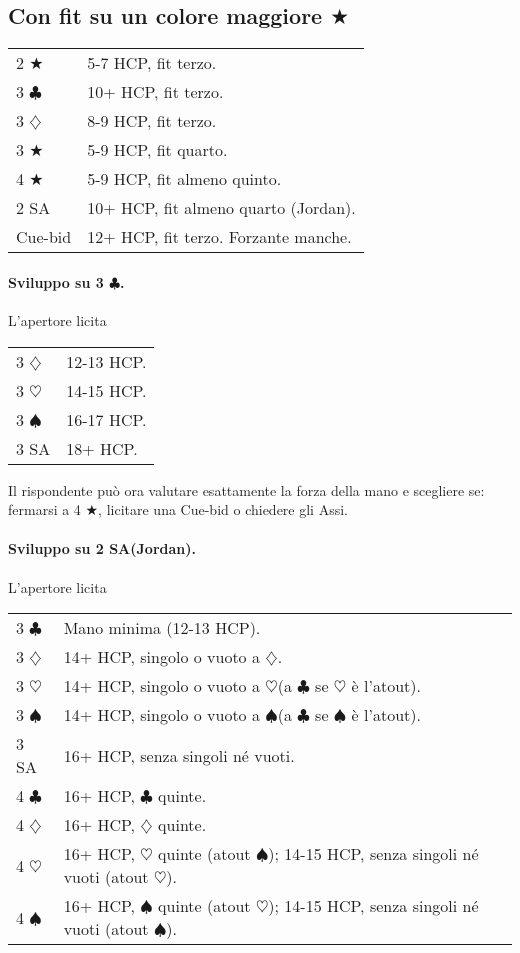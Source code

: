 \documentclass[a4paper,10pt]{article}
\renewcommand{\c}{$\clubsuit$\xspace}
\renewcommand{\d}{$\diamondsuit$\xspace}
\newcommand{\h}{$\heartsuit$\xspace}
\newcommand{\s}{$\spadesuit$\xspace}
\renewcommand{\j}{$\bigstar$\xspace}
\newcommand{\sa}{SA\xspace}
\newcommand{\smallspace}{\vskip0.3cm}
\newenvironment{twocol}
  {\smallspace\noindent\begin{tabular}{l p{0.8\textwidth}}}
  {\end{tabular}\smallspace}
\begin{document}
\subsection{Con fit su un colore maggiore \j}

\begin{twocol}
 2 \j  & 5-7 HCP, fit terzo.\\
 3 \c & 10+ HCP, fit terzo.\\
 3 \d & 8-9 HCP, fit terzo.\\
 3 \j  & 5-9 HCP, fit quarto.\\
 4 \j  & 5-9 HCP, fit almeno quinto.\\
 2 \sa & 10+ HCP, fit almeno quarto (Jordan).\\
 Cue-bid & 12+ HCP, fit terzo. Forzante manche.
\end{twocol}

\paragraph{Sviluppo su 3 \c.} L'apertore licita
\begin{twocol}
 3 \d & 12-13 HCP.\\
 3 \h & 14-15 HCP.\\
 3 \s & 16-17 HCP.\\
 3 \sa & 18+ HCP.
\end{twocol}

Il rispondente può ora valutare esattamente la forza della mano e scegliere se: fermarsi a 4 \j, licitare una Cue-bid o chiedere gli Assi.

\paragraph{Sviluppo su 2 \sa (Jordan).} L'apertore licita
\begin{twocol}
 3 \c & Mano minima (12-13 HCP).\\
 3 \d & 14+ HCP, singolo o vuoto a \d.\\
 3 \h & 14+ HCP, singolo o vuoto a \h (a \c se \h è l'atout).\\
 3 \s & 14+ HCP, singolo o vuoto a \s (a \c se \s è l'atout).\\
 3 \sa & 16+ HCP, senza singoli né vuoti.\\
 4 \c & 16+ HCP, \c quinte.\\
 4 \d & 16+ HCP, \d quinte.\\
 4 \h & 16+ HCP, \h quinte (atout \s); 14-15 HCP, senza singoli né vuoti (atout \h).\\
 4 \s & 16+ HCP, \s quinte (atout \h); 14-15 HCP, senza singoli né vuoti (atout \s).
\end{twocol}
\end{document}
